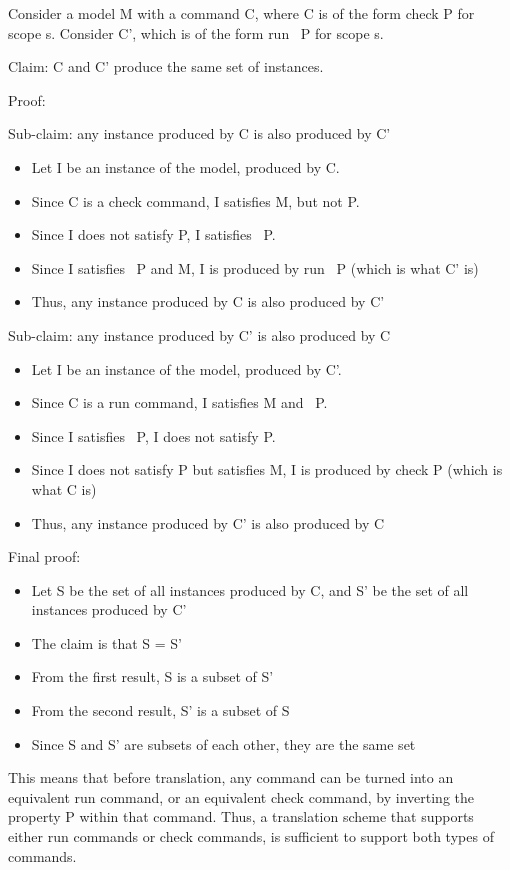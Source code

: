 Consider a model M with a command C, where C is of the form check P for scope s. Consider C', which is of the form run ~P for scope s. 

Claim: C and C' produce the same set of instances.

Proof:

Sub-claim: any instance produced by C is also produced by C'

\begin{itemize}
  \item Let I be an instance of the model, produced by C.
  \item Since C is a check command, I satisfies M, but not P.
  \item Since I does not satisfy P, I satisfies ~P.
  \item Since I satisfies ~P and M, I is produced by run ~P (which is what C' is)
  \item Thus, any instance produced by C is also produced by C'
\end{itemize}

Sub-claim: any instance produced by C' is also produced by C

\begin{itemize}
  \item Let I be an instance of the model, produced by C'.
  \item Since C is a run command, I satisfies M and ~P.
  \item Since I satisfies ~P, I does not satisfy P.
  \item Since I does not satisfy P but satisfies M, I is produced by check P (which is what C is)
  \item Thus, any instance produced by C' is also produced by C
\end{itemize}

Final proof:

\begin{itemize}
  \item Let S be the set of all instances produced by C, and S' be the set of all instances produced by C'
  \item The claim is that S = S'
  \item From the first result, S is a subset of S'
  \item From the second result, S' is a subset of S
  \item Since S and S' are subsets of each other, they are the same set
\end{itemize}

This means that before translation, any command can be turned into an equivalent run command, or an equivalent check command, by inverting the property P within that command. Thus, a translation scheme that supports either run commands or check commands, is sufficient to support both types of commands.